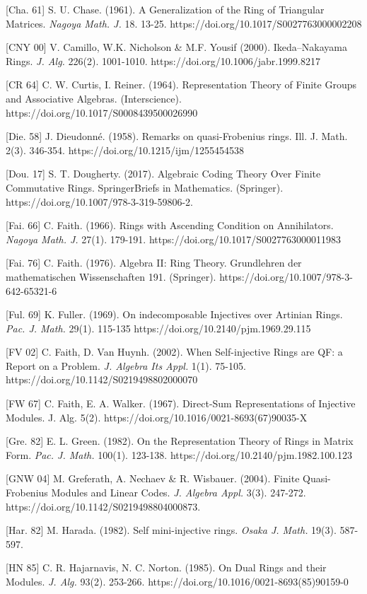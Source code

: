 \documentclass[11pt]{article}
\theoremstyle{plain}
\theoremstyle{remark}
\theoremstyle{plain}
\begin{document}
[Cha. 61] S. U. Chase. (1961). A Generalization of the Ring of Triangular Matrices. \textit{Nagoya Math. J.} 18. 13-25. https://doi.org/10.1017/S0027763000002208

[CNY 00] V. Camillo,  W.K. Nicholson \&  M.F. Yousif (2000). Ikeda–Nakayama Rings. \textit{J. Alg.} 226(2). 1001-1010. https://doi.org/10.1006/jabr.1999.8217

[CR 64] C. W. Curtis, I. Reiner. (1964). Representation Theory of Finite Groups and Associative Algebras. (Interscience). https://doi.org/10.1017/S0008439500026990

[Die. 58] J. Dieudonné. (1958). Remarks on quasi-Frobenius rings. Ill. J. Math. 2(3). 346-354. https://doi.org/10.1215/ijm/1255454538

[Dou. 17] S. T. Dougherty.  (2017). Algebraic Coding Theory Over Finite Commutative Rings. SpringerBriefs in Mathematics. (Springer). https://doi.org/10.1007/978-3-319-59806-2.

[Fai. 66] C. Faith. (1966). Rings with Ascending Condition on Annihilators.\textit{ Nagoya Math. J.} 27(1). 179-191. https://doi.org/10.1017/S0027763000011983

[Fai. 76] C. Faith. (1976). Algebra II:
Ring Theory. Grundlehren der mathematischen Wissenschaften 191. (Springer). https://doi.org/10.1007/978-3-642-65321-6  

[Ful. 69] K. Fuller. (1969). On indecomposable Injectives over Artinian Rings. \textit{Pac. J. Math.} 29(1). 115-135 https://doi.org/10.2140/pjm.1969.29.115

[FV 02] C. Faith, D. Van Huynh. (2002).  When Self-injective Rings are QF: a Report on a Problem. 	\textit{J. Algebra Its Appl.} 1(1). 75-105. https://doi.org/10.1142/S0219498802000070

[FW 67]  C. Faith, E. A. Walker. (1967). Direct-Sum Representations of Injective Modules. J. Alg. 5(2). https://doi.org/10.1016/0021-8693(67)90035-X

[Gre. 82] E. L. Green. (1982). On the Representation Theory of Rings in Matrix Form.  \textit{Pac. J. Math.} 100(1). 123-138. https://doi.org/10.2140/pjm.1982.100.123

[GNW 04] M. Greferath, A. Nechaev \& R. Wisbauer. (2004). Finite Quasi-Frobenius Modules and Linear Codes. \textit{J. Algebra Appl.} 3(3). 247-272. https://doi.org/10.1142/S0219498804000873.

[Har. 82] M. Harada. (1982). Self mini-injective rings. \textit{Osaka J. Math.} 19(3). 587-597. 


[HN 85] C. R. Hajarnavis, N. C. Norton. (1985). On Dual Rings and their Modules. \textit{J. Alg.} 93(2). 253-266. https://doi.org/10.1016/0021-8693(85)90159-0
\end{document}
